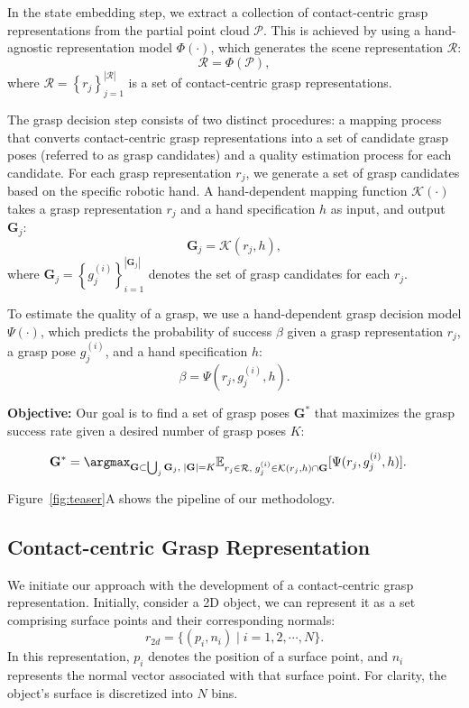 In the state embedding step, we extract a collection of contact-centric grasp representations from the partial point cloud $\mathcal{P}$. This is achieved by using a hand-agnostic representation model $\Phi(\cdot)$, which generates the scene representation $\mathcal{R}$:
\begin{equation}
\mathcal{R} = \Phi(\mathcal{P}),
\end{equation}
where $\mathcal{R} = \left\{r_j\right\}_{j=1}^{|\mathcal{R}|}$ is a set of contact-centric grasp representations.

The grasp decision step consists of two distinct procedures: a mapping process that converts contact-centric grasp representations into a set of candidate grasp poses (referred to as grasp candidates) and a quality estimation process for each candidate. For each grasp representation $r_j$, we generate a set of grasp candidates based on the specific robotic hand. A hand-dependent mapping function $\mathcal{K}(\cdot)$ takes a grasp representation $r_j$ and a hand specification $h$ as input, and output $\mathbf{G}_j$:
\begin{equation}
\mathbf{G}_j = \mathcal{K}(r_j, h),
\end{equation}
where $\mathbf{G}_j = \left\{g^{(i)}_j\right\}_{i=1}^{|\mathbf{G}_j|}$ denotes the set of grasp candidates for each $r_j$.

To estimate the quality of a grasp, we use a hand-dependent grasp decision model $\Psi(\cdot)$, which predicts the probability of success $\beta$ given a grasp representation $r_j$, a grasp pose $g^{(i)}_j$, and a hand specification $h$:
\begin{equation}
\beta = \Psi(r_j, g^{(i)}_j, h).
\end{equation}

\textbf{Objective:} Our goal is to find a set of grasp poses $\mathbf{G}^*$ that maximizes the grasp success rate given a desired number of grasp poses $K$:

\begin{align}
\mathbf{G}^* & =  \argmax_{\mathbf{G} \subset \bigcup_j \mathbf{G}_j, \; |\mathbf G|=K}\mathbb{E}_{r_j\in \mathcal{R},\; g_j^{(i)}\in \mathcal{K}(r_j, h) \cap \mathbf{G}}[\Psi(r_j, g_j^{(i)}, h)].
\end{align}

Figure~\ref{fig:teaser}A shows the pipeline of our methodology.




\subsection{Contact-centric Grasp Representation} \label{antipodal_representaiton}
We initiate our approach with the development of a contact-centric grasp representation. Initially, consider a 2D object, we can represent it as a set comprising surface points and their corresponding normals:
\begin{equation}
r_{2d} = \{(p_i,n_i) \mid i=1,2,\cdots,N\}.
\end{equation}
In this representation, $p_i$ denotes the position of a surface point, and $n_i$ represents the normal vector associated with that surface point. For clarity, the object's surface is discretized into $N$ bins.
 
